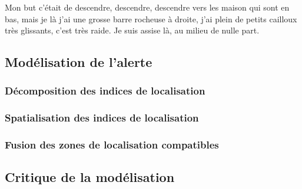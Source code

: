 \begin{dialogue}
  \Req {} Mon but c’était de descendre, descendre, descendre
  vers les maison qui sont en bas,  mais je là j’ai une
  grosse barre rocheuse à droite,  j’ai plein de petits
  cailloux très glissants,  c’est très raide.  Je
  suis assise là, au milieu de nulle part.
\end{dialogue}

\subsection{Modélisation de l'alerte}
\label{subsec:9-3-2}

\subsubsection{Décomposition des indices de localisation}
\label{subsec:9-3-2-2}

\subsubsection{Spatialisation des indices de localisation}
\label{subsec:9-3-2-3}

\subsubsection{Fusion des zones de localisation compatibles}
\label{subsec:9-3-2-4}

\subsection{Critique de la modélisation}
\label{subsec:9-3-3}


